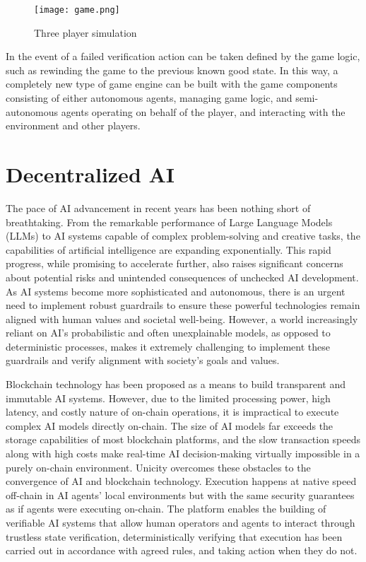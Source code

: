 \documentclass{article}
\begin{document}
\begin{figure}[H]
    \centering
    \texttt{[image: game.png]}
    \caption{Three player simulation}
    \label{fig:game}
\end{figure}

In the event of a failed verification action can be taken defined by the game logic, such as rewinding the game to the previous known good state. In this way, a completely new type of game engine can be built with the game components consisting of either autonomous agents, managing game logic, and semi-autonomous agents operating on behalf of the player, and interacting with the environment and other players.

\section{Decentralized AI}



The pace of AI advancement in recent years has been nothing short of breathtaking. From the remarkable performance of Large Language Models (LLMs) to AI systems capable of complex problem-solving and creative tasks, the capabilities of artificial intelligence are expanding exponentially. This rapid progress, while promising to accelerate further, also raises significant concerns about potential risks and unintended consequences of unchecked AI development. As AI systems become more sophisticated and autonomous, there is an urgent need to implement robust guardrails to ensure these powerful technologies remain aligned with human values and societal well-being. However, a world increasingly reliant on AI's probabilistic and often unexplainable models, as opposed to deterministic processes, makes it extremely challenging to implement these guardrails and verify alignment with society's goals and values.



Blockchain technology has been proposed as a means to build transparent and immutable AI systems. However, due to the limited processing power, high latency, and costly nature of on-chain operations, it is impractical to execute complex AI models directly on-chain. The size of AI models far exceeds the storage capabilities of most blockchain platforms, and the slow transaction speeds along with high costs make real-time AI decision-making virtually impossible in a purely on-chain environment. Unicity overcomes these obstacles to the convergence of AI and blockchain technology. Execution happens at native speed off-chain in AI agents' local environments but with the same security guarantees as if agents were executing on-chain. The platform enables the building of verifiable AI systems that allow human operators and agents to interact through trustless state verification, deterministically verifying that execution has been carried out in accordance with agreed rules, and taking action when they do not.
\end{document}
